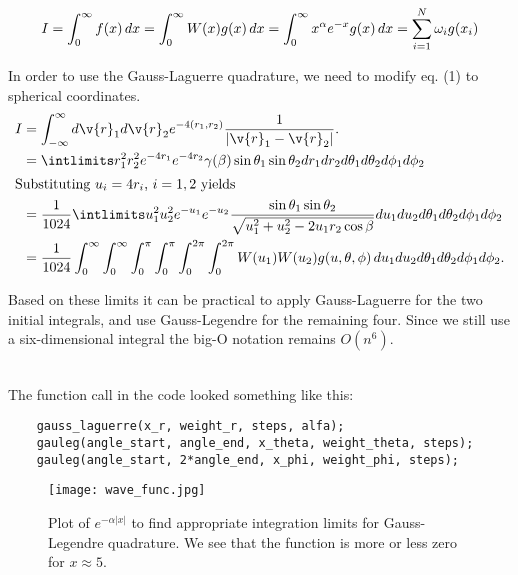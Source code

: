 \documentclass{article}
\begin{document}
\begin{align}
  \notag I = \int_0^\infty f(x) \, dx = \int_0^\infty W(x)g(x) \, dx =
  \int_0^\infty x^\alpha e^{-x} g(x) \, dx = \sum^{N}_{i=1} \omega_ig(x_i)
\end{align}

In order to use the Gauss-Laguerre quadrature, we need to modify eq. (1)
to spherical coordinates. 
\begin{align*}
  I &= \int_{-\infty}^{\infty} d\v{r}_1d\v{r}_2 e^{-4(r_1, r_2)} \frac{1}{\left| \v{r}_1 - \v{r}_2 \right|}.\\
    &= \intlimits r_1^2r_2^2e^{-4r_1} e^{-4r_2} \gamma(\beta)\sin\theta_1\sin\theta_2 dr_1dr_2d\theta_1d\theta_2d\phi_1d\phi_2\\
  \intertext{Substituting $u_i = 4r_i$, $i = 1, 2$ yields}
  &= \frac{1}{1024}\intlimits u_1^2u_2^2e^{-u_1}e^{-u_2} \frac{\sin\theta_1\sin\theta_2}{\sqrt{u_1^2 + u_2^2 - 2u_1r_2\cos\beta}} du_1du_2d\theta_1d\theta_2d\phi_1d\phi_2\\
    &=\frac{1}{1024} \int_{0}^\infty\int_0^\infty\int_0^{\pi}\int_0^\pi\int_0^{2\pi}\int_0^{2\pi}W(u_1)W(u_2)g(u, \theta, \phi)\,du_1du_2d\theta_1d\theta_2d\phi_1d\phi_2.
\end{align*}

Based on these limits it can be practical to apply Gauss-Laguerre  for
the two initial integrals, and use Gauss-Legendre for the remaining four.
Since we still use a six-dimensional integral the big-O notation remains $O(n^6)$.\\\

The function call in the code looked something like this:
\begin{lstlisting}
    gauss_laguerre(x_r, weight_r, steps, alfa);
    gauleg(angle_start, angle_end, x_theta, weight_theta, steps);
    gauleg(angle_start, 2*angle_end, x_phi, weight_phi, steps);
\end{lstlisting}



\begin{figure}[H]
    \centering
	\texttt{[image: wave\_func.jpg]}
	\caption{Plot of $e^{-\alpha |x|}$ to find appropriate integration limits for Gauss-Legendre quadrature. We see that the function is more or less zero for $x\approx 5$.}
	\label{fig: integration limits Gauss-Legendre}
\end{figure} 
\end{document}
